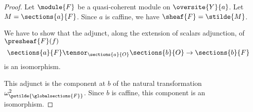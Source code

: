 
\begin{proof}
Let $\module{F}$ be a quasi-coherent module on $\oversite{Y}{a}$.
Let $M = \sections{a}{F}$.
Since $a$ is caffine, we have $\sheaf{F} = \stilde{M}$.

We have to show that the adjunct, along the extension of scalars adjunction, of $\presheaf{F}(f)$
\[\sections{a}{F} \tensor_{\sections{a}{O}} \sections{b}{O} \rightarrow \sections{b}{F}\]
is an isomorphism.

This adjunct is the component at $b$ of the natural transformation $\omega^2_{\pstilde{\globalsections{F}}}$.
Since $b$ is caffine, this component is an isomorphism.







\end{proof}
